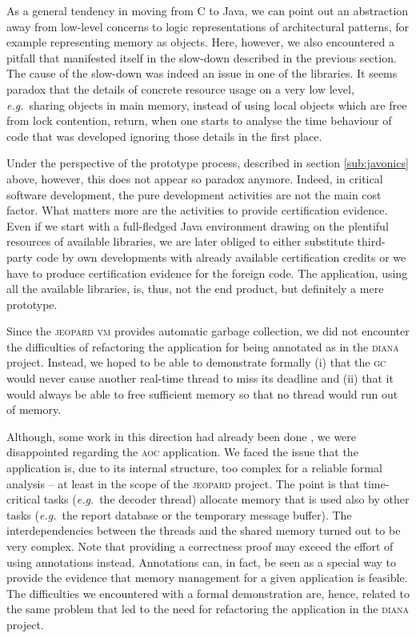 \documentclass{sig-alternate}
\newcommand{\acronym}[1]{\textsc{#1}}
\newcommand{\eg}{\textit{e.g.}}
\begin{document}
As a general tendency in moving from C to Java,
we can point out an abstraction away
from low-level concerns to logic representations
of architectural patterns, for example 
representing memory as objects.
Here, however, we also encountered a pitfall
that manifested itself in the slow-down
described in the previous section.
The cause of the slow-down was indeed
an issue in one of the libraries.
It seems paradox that the details 
of concrete resource usage on a very low level,
\eg\ sharing objects in main memory, instead of
using local objects which are free from lock contention,
return, when one starts to analyse the time behaviour
of code that was developed 
ignoring those details in the first place.

Under the perspective of the prototype process, 
described in section \ref{sub:javonics} above, however,
this does not appear so paradox anymore.
Indeed, in critical software development,
the pure development activities are not the main cost factor.
What matters more are the activities 
to provide certification evidence.
Even if we start with a full-fledged Java environment
drawing on the plentiful resources of available libraries,
we are later obliged to either substitute third-party code
by own developments with already available certification credits
or we have to produce certification evidence for the foreign code.
The application, using all the available libraries,
is, thus, not the end product, but definitely a mere prototype.

Since the \acronym{jeopard} \acronym{vm} 
provides automatic garbage collection,
we did not encounter the difficulties
of refactoring the application for being annotated 
as in the \acronym{diana} project.
Instead, we hoped to be able to demonstrate formally
 (i) that the \acronym{gc} would never cause another 
     real-time thread to miss its deadline and
(ii) that it would always be able to free
     sufficient memory so that no thread would run out of memory.

Although, some work in this direction had already been done \cite{sie:08},
we were disappointed regarding the \acronym{aoc} application.
We faced the issue that the application is, 
due to its internal structure, too complex
for a reliable formal analysis -- 
at least in the scope of the \acronym{jeopard} project.
The point is that time-critical tasks
(\eg\ the decoder thread)
allocate memory that is used also by other tasks
(\eg\ the report database or the temporary message buffer).
The interdependencies between the threads
and the shared memory turned out to be very complex.
Note that providing a correctness proof
may exceed the effort of using annotations instead.
Annotations can, in fact, be seen as a special way
to provide the evidence that memory management
for a given application is feasible.
The difficulties we encountered with a formal demonstration
are, hence, related to the same problem 
that led to the need for refactoring 
the application in the \acronym{diana} project.
\end{document}
